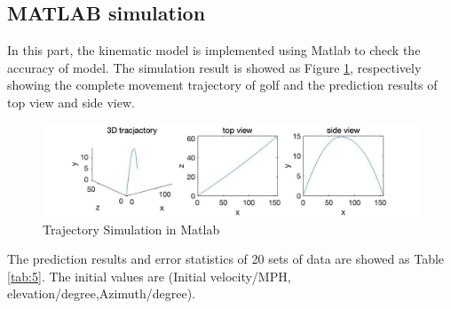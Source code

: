\subsection{MATLAB simulation}
In this part, the kinematic model is implemented using Matlab to check  the accuracy of model. The simulation result is showed as Figure \ref{fig:matlab}, respectively showing the complete movement trajectory of golf and the prediction results of top view and side view.
\begin{figure}[H]
    \centering
    \includegraphics[width=\textwidth]{figure/Matlab.jpg}
    \caption{Trajectory Simulation in Matlab}
    \label{fig:matlab}
\end{figure}
The prediction results and error statistics of 20 sets of data are showed as Table \ref{tab:5}. The initial values are (Initial velocity/MPH, elevation/degree,Azimuth/degree).
